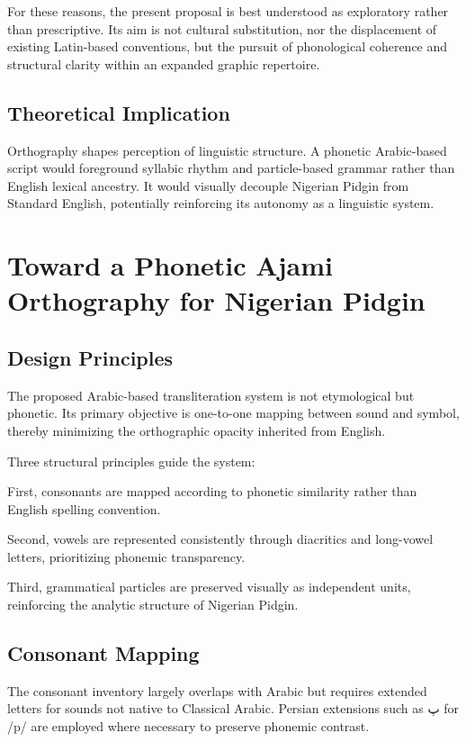 \documentclass[12pt]{article}
\newcommand{\AR}[1]{\foreignlanguage{arabic}{#1}}
\begin{document}
For these reasons, the present proposal is best understood as exploratory rather than prescriptive. Its aim is not cultural substitution, nor the displacement of existing Latin-based conventions, but the pursuit of phonological coherence and structural clarity within an expanded graphic repertoire.

\subsection{Theoretical Implication}

Orthography shapes perception of linguistic structure. A phonetic Arabic-based script would foreground syllabic rhythm and particle-based grammar rather than English lexical ancestry. It would visually decouple Nigerian Pidgin from Standard English, potentially reinforcing its autonomy as a linguistic system.

\section{Toward a Phonetic Ajami Orthography for Nigerian Pidgin}

\subsection{Design Principles}

The proposed Arabic-based transliteration system is not etymological but phonetic. Its primary objective is one-to-one mapping between sound and symbol, thereby minimizing the orthographic opacity inherited from English.

Three structural principles guide the system:

First, consonants are mapped according to phonetic similarity rather than English spelling convention.

Second, vowels are represented consistently through diacritics and long-vowel letters, prioritizing phonemic transparency.

Third, grammatical particles are preserved visually as independent units, reinforcing the analytic structure of Nigerian Pidgin.

\subsection{Consonant Mapping}

The consonant inventory largely overlaps with Arabic but requires extended letters for sounds not native to Classical Arabic. Persian extensions such as \AR{پ} for /p/ are employed where necessary to preserve phonemic contrast.
\end{document}

